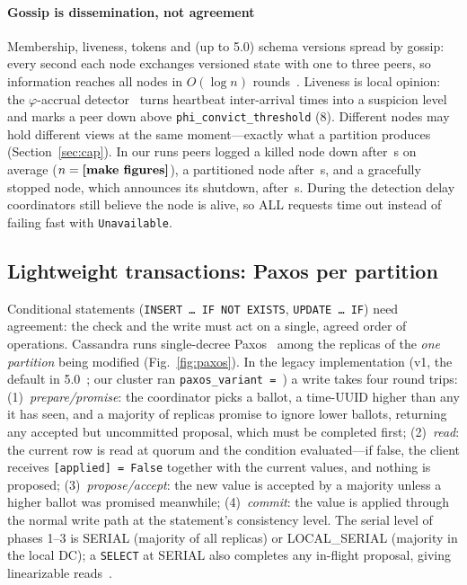 \paragraph{Gossip is dissemination, not agreement}
Membership, liveness, tokens and (up to 5.0) schema versions spread by gossip: every second
each node exchanges versioned state with one to three peers, so information reaches all
nodes in $O(\log n)$ rounds~\cite{demers1987epidemic}. Liveness is local opinion: the
$\varphi$-accrual detector~\cite{hayashibara2004phi} turns heartbeat inter-arrival times into a
suspicion level and marks a peer down above \texttt{phi\_convict\_threshold} (8). Different
nodes may hold different views at the same moment---exactly what a partition produces
(Section~\ref{sec:cap}). In our runs peers logged a killed node down after
\,s on average ($n=\expfault{det-kill-n}$), a partitioned node after
\,s, and a gracefully stopped node, which announces its shutdown,
after \,s. During the detection delay coordinators still believe the node is
alive, so ALL requests time out instead of failing fast with \texttt{Unavailable}.

\subsection{Lightweight transactions: Paxos per partition}

Conditional statements (\texttt{INSERT \ldots\ IF NOT EXISTS}, \texttt{UPDATE \ldots\ IF}) need
agreement: the check and the write must act on a single, agreed order of operations. Cassandra
runs single-decree Paxos~\cite{lamport1998parttime,lamport2001simple} among the replicas of the
\emph{one partition} being modified (Fig.~\ref{fig:paxos}). In the legacy implementation (v1,
the default in 5.0~\cite{cass21316}; our cluster ran \texttt{paxos\_variant =
}) a write takes four round trips:
(1)~\emph{prepare/promise}: the coordinator picks a ballot, a time-UUID higher than any it has
seen, and a majority of replicas promise to ignore lower ballots, returning any accepted but
uncommitted proposal, which must be completed first;
(2)~\emph{read}: the current row is read at quorum and the condition evaluated---if false, the
client receives \texttt{[applied] = False} together with the current values, and nothing is
proposed;
(3)~\emph{propose/accept}: the new value is accepted by a majority unless a higher ballot was
promised meanwhile;
(4)~\emph{commit}: the value is applied through the normal write path at the statement's
consistency level. The serial level of phases 1--3 is SERIAL (majority of all replicas) or
LOCAL\_SERIAL (majority in the local DC); a \texttt{SELECT} at SERIAL also completes any
in-flight proposal, giving linearizable reads~\cite{herlihy1990linearizability}.

